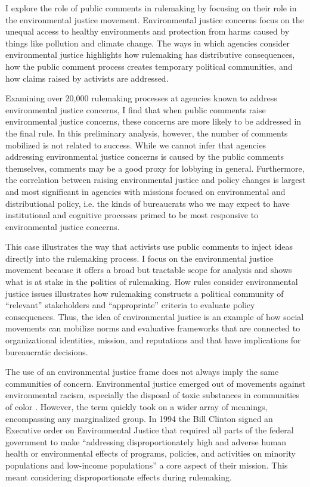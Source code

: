 I explore the role of public comments in rulemaking by focusing on their role in the environmental justice movement. Environmental justice concerns focus on the unequal access to healthy environments and protection from harms caused by things like pollution and climate change. The ways in which agencies consider environmental justice highlights how rulemaking has distributive consequences, how the public comment process creates temporary political communities, and how claims raised by activists are addressed. %

Examining over 20,000 rulemaking processes at agencies known to address environmental justice concerns, I find that when public comments raise environmental justice concerns, these concerns are more likely to be addressed in the final rule. In this preliminary analysis, however, the number of comments mobilized is not related to success. While we cannot infer that agencies addressing environmental justice concerns is caused by the public comments themselves, comments may be a good proxy for lobbying in general. Furthermore, the correlation between raising environmental justice and policy changes is largest and most significant in agencies with missions focused on environmental and distributional policy, i.e. the kinds of bureaucrats who we may expect to have institutional and cognitive processes primed to be most responsive to environmental justice concerns.

This case illustrates the way that activists use public comments to inject ideas directly into the rulemaking process. I focus on the environmental justice movement because it offers a broad but tractable scope for analysis and shows what is at stake in the politics of rulemaking.  How rules consider environmental justice issues illustrates how rulemaking constructs a political community of ``relevant'' stakeholders and ``appropriate'' criteria to evaluate policy consequences. Thus, the idea of environmental justice is an example of how social movements can mobilize norms and evaluative frameworks that are connected to organizational identities, mission, and reputations and that have implications for bureaucratic decisions. 

The use of an environmental justice frame does not always imply the same communities of concern. Environmental justice emerged out of movements against environmental racism, especially the disposal of toxic substances in communities of color \citep{Bullard1993}. However, the term quickly took on a wider array of meanings, encompassing any marginalized group. In 1994 the Bill Clinton signed an Executive order on Environmental Justice that required all parts of the federal government to make ``addressing disproportionately high and adverse human health or environmental effects of programs, policies, and activities on minority populations and low-income populations'' a core aspect of their mission. This meant considering disproportionate effects during rulemaking.

